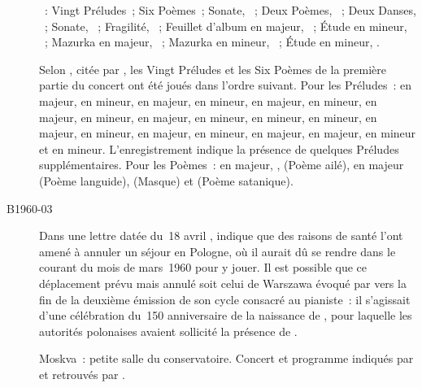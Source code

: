 \begin{description}
 \textsc{\Scriabine{}}~: Vingt Préludes~; Six Poèmes~; Sonate, ~;
 Deux Poèmes, ~; Deux Danses, ~; Sonate, ~;
 Fragilité,  ~; Feuillet d'album en \kE \Flat majeur,
  ~; Étude en \kC \Sharp mineur,  ~;
 Mazurka en \kF \Sharp majeur,  ~; Mazurka en \kE mineur,
  ~; Étude en \kD \Sharp mineur,  .

 Selon \citeauthor{Bragina}, citée par \citet[p.~442-443]{Scriabine}, les
 Vingt Préludes et les Six Poèmes de la première partie du concert ont été
 joués dans l'ordre suivant.
 Pour les Préludes~:   en \kC majeur, 
  en \kA mineur,   en \kG majeur, 
  en \kE mineur,   en \kD majeur, 
  en \kB mineur,   en \kA majeur, 
  en \kC \Sharp mineur,   en \kE majeur,
   en \kC \Sharp mineur,   en \kC
 \Sharp mineur,   en \kG \Sharp mineur, 
  en \kF \Sharp majeur,   en \kE \Flat mineur,
   en \kD \Flat majeur,   en \kB
 \Flat mineur,   en \kE \Flat majeur, 
  en \kB \Flat majeur,   en \kG mineur et
   en \kD mineur.
 L'enregistrement indique la présence de quelques Préludes supplémentaires.
 Pour les Poèmes~:   en \kC majeur,  ,
   (Poème ailé),   en \kB majeur
 (Poème languide),   (Masque) et  (Poème
 satanique).
 \item[B1960-03]
 Dans une lettre datée du~18 avril \citep[voir][p.~184]{Nekrasova08},
 \VSofronitsky{} indique que des raisons de santé l'ont amené à annuler un
 séjour en Pologne, où il aurait dû se rendre dans le courant du mois de
 mars~1960 pour y jouer.
 Il est possible que ce déplacement prévu mais annulé soit celui de Warszawa
 évoqué par \citet{Voskobojnikov08} vers la fin de la deuxième émission de
 son cycle consacré au pianiste~: il s'agissait d'une célébration
 du~150\ieme{} anniversaire de la naissance de \Chopin{}, pour laquelle les
 autorités polonaises avaient sollicité la présence de \Sofronitsky{}.
 \item[\DateWithWeekDay{1960-03-12}]
 Moskva~: petite salle du conservatoire.
 Concert et programme indiqués par \citet[p.~183]{Nekrasova08} et retrouvés
 par \citet{TADGO1960}.


\end{description}
